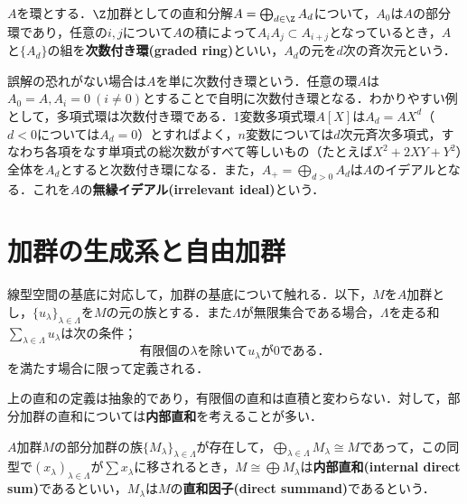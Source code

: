 \begin{defi}[次数付き環]
	$A$を環とする．$\Z$加群としての直和分解$A=\bigoplus_{d\in\Z}A_d$について，$A_0$は$A$の部分環であり，任意の$i,j$について$A$の積によって$A_iA_j\subset A_{i+j}$となっているとき，$A$と$\{A_d\}$の組を\textbf{次数付き環(graded ring)}といい，$A_d$の元を$d$次の斉次元という．
\end{defi}

誤解の恐れがない場合は$A$を単に次数付き環という．任意の環$A$は$A_0=A, A_i=0 ~(i\neq 0)$とすることで自明に次数付き環となる．わかりやすい例として，多項式環は次数付き環である．1変数多項式環$A[X]$は$A_d=AX^d$（$d<0$については$A_d=0$）とすればよく，$n$変数については$d$次元斉次多項式，すなわち各項をなす単項式の総次数がすべて等しいもの（たとえば$X^2+2XY+Y^2$）全体を$A_d$とすると次数付き環になる．また，$A_+=\bigoplus_{d>0}A_d$は$A$のイデアルとなる．これを$A$の\textbf{無縁イデアル(irrelevant ideal)}という．

\section{加群の生成系と自由加群}
線型空間の基底に対応して，加群の基底について触れる．以下，$M$を$A$加群とし，$\{u_\lambda\}_{\lambda\in\Lambda}$を$M$の元の族とする．また$\Lambda$が無限集合である場合，$\Lambda$を走る和$\sum_{\lambda\in\Lambda} u_\lambda$は次の条件；
\[\text{有限個の}\lambda\text{を除いて}u_\lambda\text{が0である．}\tag{$\ast$}\]
を満たす場合に限って定義される．

上の直和の定義は抽象的であり，有限個の直和は直積と変わらない．対して，部分加群の直和については\textbf{内部直和}を考えることが多い．

\begin{defi}
	$A$加群$M$の部分加群の族$\{M_\lambda\}_{\lambda\in\Lambda}$が存在して，$\bigoplus_{\lambda\in\Lambda} M_\lambda\cong M$であって，この同型で$(x_\lambda)_{\lambda\in\Lambda}$が$\sum x_\lambda$に移されるとき，$M\cong\bigoplus M_\lambda$は\textbf{内部直和(internal direct sum)}であるといい，$M_\lambda$は$M$の\textbf{直和因子(direct summand)}であるという．
\end{defi}

